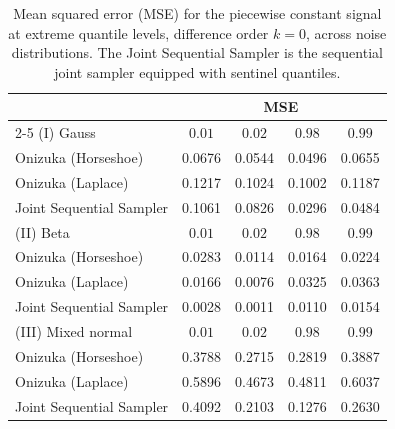 \begin{table}[htbp]
\centering
\caption{Mean squared error (MSE) for the piecewise constant signal at extreme quantile levels, difference order $k = 0$, across noise distributions. The Joint Sequential Sampler is the sequential joint sampler equipped with sentinel quantiles.}
\label{tab:pc_ext_mse}
\begin{tabular}{lcccc}
\toprule
& \multicolumn{4}{c}{MSE} \\
\cmidrule(lr){2-5}
(I) Gauss & $0.01$ & $0.02$ & $0.98$ & $0.99$ \\
\midrule
Onizuka (Horseshoe)      & 0.0676 & 0.0544 & 0.0496 & 0.0655 \\
Onizuka (Laplace)        & 0.1217 & 0.1024 & 0.1002 & 0.1187 \\
Joint Sequential Sampler & 0.1061 & 0.0826 & 0.0296 & 0.0484 \\
\midrule
(II) Beta & $0.01$ & $0.02$ & $0.98$ & $0.99$ \\
\midrule
Onizuka (Horseshoe)      & 0.0283 & 0.0114 & 0.0164 & 0.0224 \\
Onizuka (Laplace)        & 0.0166 & 0.0076 & 0.0325 & 0.0363 \\
Joint Sequential Sampler & 0.0028 & 0.0011 & 0.0110 & 0.0154 \\
\midrule
(III) Mixed normal & $0.01$ & $0.02$ & $0.98$ & $0.99$ \\
\midrule
Onizuka (Horseshoe)      & 0.3788 & 0.2715 & 0.2819 & 0.3887 \\
Onizuka (Laplace)        & 0.5896 & 0.4673 & 0.4811 & 0.6037 \\
Joint Sequential Sampler & 0.4092 & 0.2103 & 0.1276 & 0.2630 \\
\bottomrule
\end{tabular}
\end{table}

